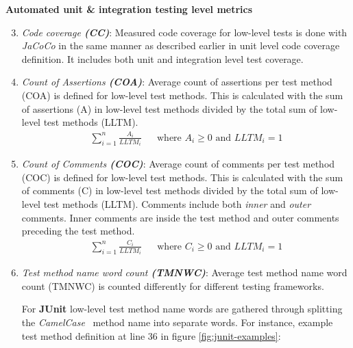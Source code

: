     \begin{addmargin}[0em]{0em}
    \vspace{10px}
    \textbf{Automated unit \& integration testing level metrics}
    \vspace{5px}
    \newline
    \begin{enumerate}
    \setcounter{enumi}{2}
    \item \textit{Code coverage \textbf{(CC)}}:
    Measured code coverage for low-level tests is done with \textit{JaCoCo} in the same manner as described earlier in
    unit level code coverage definition. It includes both unit and integration level test coverage.

    \item \textit{Count of Assertions \textbf{(COA)}}:
    Average count of assertions per test method (COA) is defined for low-level test methods. This is calculated with
    the sum of assertions (A) in low-level test methods divided by the total sum of low-level test methods (LLTM).
    \begin{align*}
        \sum_{i=1}^{n}\frac{A_{i}}{LLTM_{i}} && \text {where } A_{i} \geq 0 \text{ and } LLTM_{i} = 1
    \end{align*}

    \item \textit{Count of Comments \textbf{(COC)}}:
    Average count of comments per test method (COC) is defined for low-level test methods. This is calculated with the
    sum of comments (C) in low-level test methods divided by the total sum of low-level test methods (LLTM). Comments include both
    \textit{inner} and \textit{outer} comments. Inner comments are inside the test method and outer comments preceding the test method.
    \begin{align*}
        \sum_{i=1}^{n}\frac{C_{i}}{LLTM_{i}} && \text {where } C_{i} \geq 0 \text{ and } LLTM_{i} = 1
    \end{align*}

    \item \textit{Test method name word count \textbf{(TMNWC)}}:
    Average test method name word count (TMNWC) is counted differently for different testing frameworks.

    For \textbf{JUnit} low-level test method name words are gathered through splitting the \textit{CamelCase}~\cite{wiki:camelcase}
    method name into separate words. For instance, example test method definition at line 36 in figure \ref{fig:junit-examples}:



\end{enumerate}
\end{addmargin}
